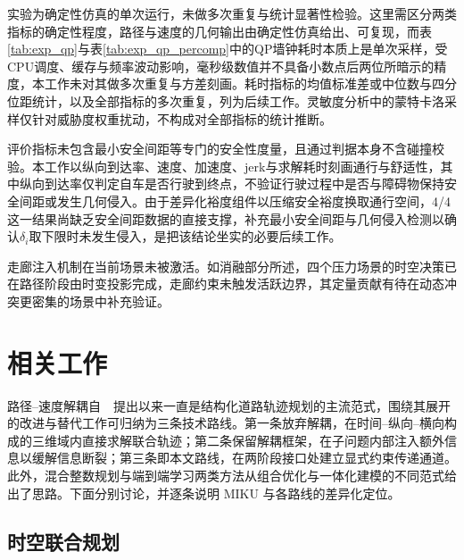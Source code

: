 \documentclass[a4paper,11pt]{ctexart}
\theoremstyle{definition}
\begin{document}
实验为确定性仿真的单次运行，未做多次重复与统计显著性检验。这里需区分两类指标的确定性程度，路径与速度的几何输出由确定性仿真给出、可复现，而表\ref{tab:exp_qp}与表\ref{tab:exp_qp_percomp}中的QP墙钟耗时本质上是单次采样，受CPU调度、缓存与频率波动影响，毫秒级数值并不具备小数点后两位所暗示的精度，本工作未对其做多次重复与方差刻画。耗时指标的均值标准差或中位数与四分位距统计，以及全部指标的多次重复，列为后续工作。灵敏度分析中的蒙特卡洛采样仅针对威胁度权重扰动，不构成对全部指标的统计推断。

评价指标未包含最小安全间距等专门的安全性度量，且通过判据本身不含碰撞校验。本工作以纵向到达率、速度、加速度、jerk与求解耗时刻画通行与舒适性，其中纵向到达率仅判定自车是否行驶到终点，不验证行驶过程中是否与障碍物保持安全间距或发生几何侵入。由于差异化裕度组件以压缩安全裕度换取通行空间，4/4 这一结果尚缺乏安全间距数据的直接支撑，补充最小安全间距与几何侵入检测以确认$\delta_i$取下限时未发生侵入，是把该结论坐实的必要后续工作。

走廊注入机制在当前场景未被激活。如消融部分所述，四个压力场景的时空决策已在路径阶段由时变投影完成，走廊约束未触发活跃边界，其定量贡献有待在动态冲突更密集的场景中补充验证。

\section{相关工作}
\label{sec:related}

路径--速度解耦自~\citet{kant1986pvd}~提出以来一直是结构化道路轨迹规划的主流范式，围绕其展开的改进与替代工作可归纳为三条技术路线。第一条放弃解耦，在时间--纵向--横向构成的三维域内直接求解联合轨迹；第二条保留解耦框架，在子问题内部注入额外信息以缓解信息断裂；第三条即本文路线，在两阶段接口处建立显式约束传递通道。此外，混合整数规划与端到端学习两类方法从组合优化与一体化建模的不同范式给出了思路。下面分别讨论，并逐条说明 MIKU 与各路线的差异化定位。

\subsection{时空联合规划}
\label{sec:related-joint}
\end{document}
